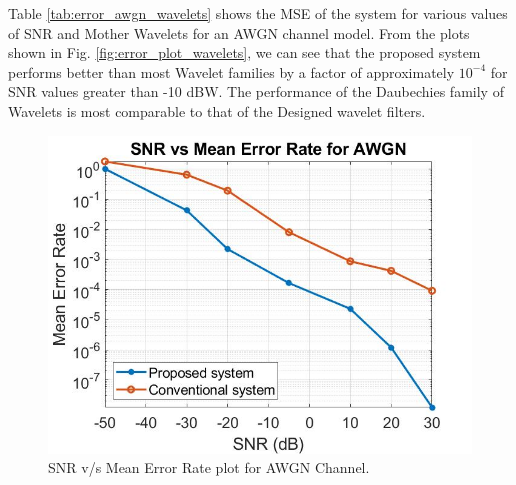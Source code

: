 Table \ref{tab:error_awgn_wavelets} shows the MSE of the system for various values of SNR and Mother Wavelets for an AWGN channel model. From the plots shown in Fig. \ref{fig:error_plot_wavelets}, we can see that the proposed system performs better than most Wavelet families by a factor of approximately $10^{-4}$ for SNR values greater than -10 dBW. The performance of the Daubechies family of Wavelets is most comparable to that of the Designed wavelet filters.


\begin{figure}[htpb]
    \centering
    \includegraphics[width=120mm]{error_rate_awgn_v3.jpg}
    \caption{SNR v/s Mean Error Rate plot for AWGN Channel.}
    \label{fig:error_plot_awgn}
\end{figure}

